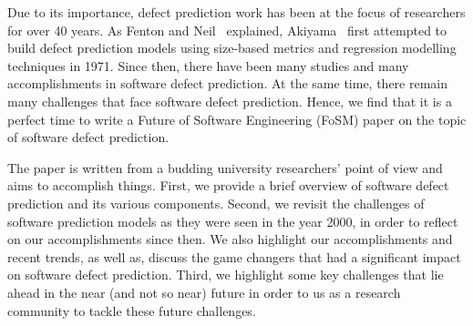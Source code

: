 


Due to its importance, defect prediction work has been at the focus of researchers for over 40 years. As Fenton and Neil~\cite{Fenton2000ICSE} explained, Akiyama~\cite{Akiyama1971IFIP} first attempted to build defect prediction models using size-based metrics and regression modelling techniques in 1971. Since then, there have been many studies and many accomplishments in software defect prediction. At the same time, there remain many challenges that face software defect prediction. Hence, we find that it is a perfect time to write a Future of Software Engineering (FoSM) paper on the topic of software defect prediction.

The paper is written from a budding university researchers' point of view and aims to accomplish  things. First, we provide a brief overview of software defect prediction and its various components. Second, we revisit the challenges of software prediction models as they were seen in the year 2000, in order to reflect on our accomplishments since then. We also highlight our accomplishments and recent trends, as well as, discuss the game changers that had a significant impact on software defect prediction. Third, we highlight some key challenges that lie ahead in the near (and not so near) future in order to us as a research community to tackle these future challenges.

